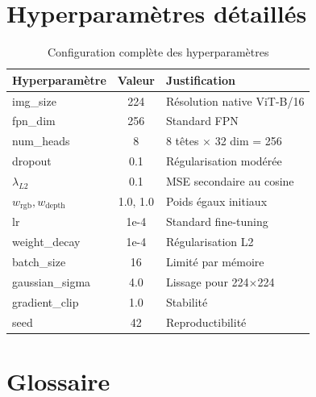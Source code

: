 \documentclass[12pt,a4paper,oneside]{report}
\begin{document}
\appendix
\chapter{Hyperparamètres détaillés}

\begin{table}[H]
\centering
\caption{Configuration complète des hyperparamètres}
\begin{tabularx}{\textwidth}{X c X}
\toprule
\textbf{Hyperparamètre} & \textbf{Valeur} & \textbf{Justification} \\
\midrule
\rowcolor{tableheader} img\_size & 224 & Résolution native ViT-B/16 \\
fpn\_dim & 256 & Standard FPN \\
\rowcolor{tableheader} num\_heads & 8 & 8 têtes $\times$ 32 dim = 256 \\
dropout & 0.1 & Régularisation modérée \\
\rowcolor{tableheader} $\lambda_{L2}$ & 0.1 & MSE secondaire au cosine \\
$w_{\text{rgb}}, w_{\text{depth}}$ & 1.0, 1.0 & Poids égaux initiaux \\
\rowcolor{tableheader} lr & 1e-4 & Standard fine-tuning \\
weight\_decay & 1e-4 & Régularisation L2 \\
\rowcolor{tableheader} batch\_size & 16 & Limité par mémoire \\
gaussian\_sigma & 4.0 & Lissage pour 224$\times$224 \\
\rowcolor{tableheader} gradient\_clip & 1.0 & Stabilité \\
seed & 42 & Reproductibilité \\
\bottomrule
\end{tabularx}
\end{table}

\chapter{Glossaire}
\end{document}
